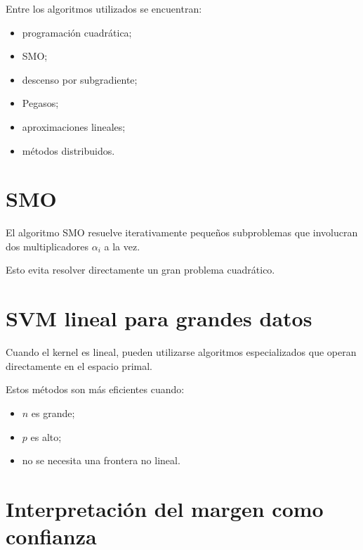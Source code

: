 \documentclass[
  spanish,
  10.5pt,
  letterpaper,
  DIV=11,
  numbers=noendperiod,
  oneside,
  open=any]{scrreprt}
\providecommand{\tightlist}{%
  \setlength{\itemsep}{0pt}\setlength{\parskip}{0pt}}
\theoremstyle{definition}
\theoremstyle{definition}
\theoremstyle{plain}
\theoremstyle{remark}
\begin{document}

Entre los algoritmos utilizados se encuentran:

\begin{itemize}
\tightlist
\item
  programación cuadrática;
\item
  SMO;
\item
  descenso por subgradiente;
\item
  Pegasos;
\item
  aproximaciones lineales;
\item
  métodos distribuidos.
\end{itemize}

\section*{SMO}\label{smo}


El algoritmo SMO resuelve iterativamente pequeños subproblemas que
involucran dos multiplicadores \(\alpha_i\) a la vez.

Esto evita resolver directamente un gran problema cuadrático.

\section*{SVM lineal para grandes
datos}\label{svm-lineal-para-grandes-datos}


Cuando el kernel es lineal, pueden utilizarse algoritmos especializados
que operan directamente en el espacio primal.

Estos métodos son más eficientes cuando:

\begin{itemize}
\tightlist
\item
  \(n\) es grande;
\item
  \(p\) es alto;
\item
  no se necesita una frontera no lineal.
\end{itemize}

\section*{Interpretación del margen como
confianza}\label{interpretaciuxf3n-del-margen-como-confianza}
\end{document}
